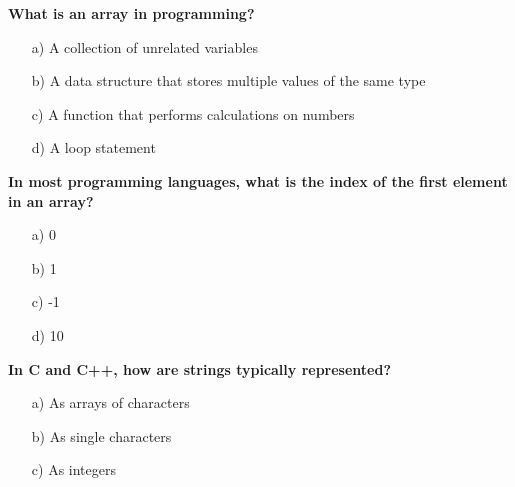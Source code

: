 \documentclass{article}
\begin{document}
\textbf{What is an array in programming?}
\begin{enumerate}
  \item[a)] A collection of unrelated variables
  \item[b)] A data structure that stores multiple values of the same type
  \item[c)] A function that performs calculations on numbers
  \item[d)] A loop statement
\end{enumerate}

\textbf{In most programming languages, what is the index of the first element in an array?}
\begin{enumerate}
  \item[a)] 0
  \item[b)] 1
  \item[c)] -1
  \item[d)] 10
\end{enumerate}

\textbf{In C and C++, how are strings typically represented?}
\begin{enumerate}
  \item[a)] As arrays of characters
  \item[b)] As single characters
  \item[c)] As integers
\end{enumerate}
\end{document}
